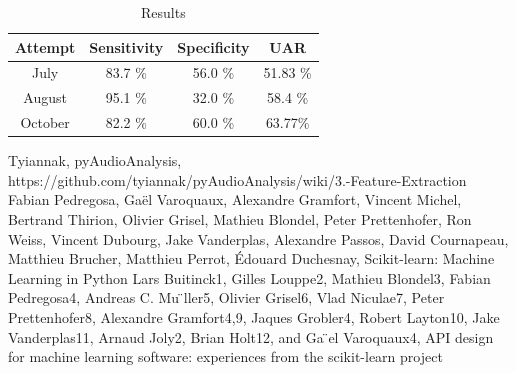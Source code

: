 \documentclass[conference]{IEEEtran}
\begin{document}
\begin{table}[htbp]
	\caption{Results}
	\begin{center}
		\begin{tabular}{|c|c|c|c|}
			\hline
			Attempt & Sensitivity & Specificity & UAR \\ 
			\hline
			July & 83.7 \% & 56.0 \% & 51.83 \% \\
			\hline
			August & 95.1 \% &  32.0 \% & 58.4 \% \\  
			\hline
			October & 82.2 \% & 60.0 \% & 63.77\% \\
			\hline
		\end{tabular}
		\label{tab3}
	\end{center}
\end{table}
		

\begin{thebibliography}{00}
 Tyiannak, pyAudioAnalysis, https://github.com/tyiannak/pyAudioAnalysis/wiki/3.-Feature-Extraction
 Fabian Pedregosa, Gaël Varoquaux, Alexandre Gramfort, Vincent Michel, Bertrand Thirion, Olivier Grisel, Mathieu Blondel, Peter Prettenhofer, Ron Weiss, Vincent Dubourg, Jake Vanderplas, Alexandre Passos, David Cournapeau, Matthieu Brucher, Matthieu Perrot, Édouard Duchesnay, Scikit-learn: Machine Learning in Python
 Lars Buitinck1, Gilles Louppe2, Mathieu Blondel3, Fabian Pedregosa4, Andreas C. Mu ̈ller5, Olivier Grisel6, Vlad Niculae7, Peter Prettenhofer8, Alexandre Gramfort4,9, Jaques Grobler4, Robert Layton10, Jake Vanderplas11, Arnaud Joly2, Brian Holt12, and Ga ̈el Varoquaux4, API design for machine learning software: experiences from the scikit-learn project
\end{thebibliography}
\end{document}
